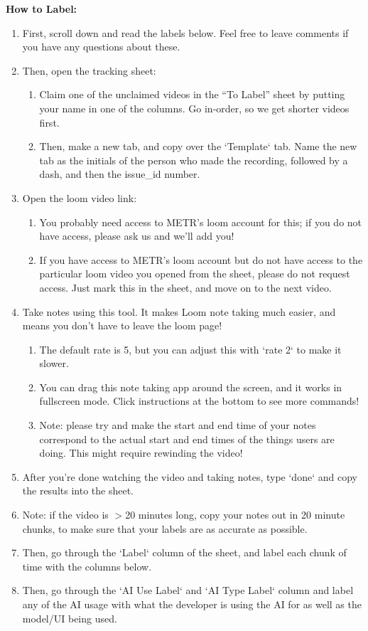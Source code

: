 \documentclass{article}
\begin{document}
\begin{instructionbox}
\textbf{How to Label:}
\begin{enumerate}
    \item First, scroll down and read the labels below. Feel free to leave comments if you have any questions about these.
    \item Then, open the tracking sheet:
    \begin{enumerate}
        \item Claim one of the unclaimed videos in the “To Label” sheet by putting your name in one of the columns. Go in-order, so we get shorter videos first.
        \item Then, make a new tab, and copy over the `Template` tab. Name the new tab as the initials of the person who made the recording, followed by a dash, and then the issue\_id number.
    \end{enumerate}
    \item Open the loom video link:
    \begin{enumerate}
        \item You probably need access to METR’s loom account for this; if you do not have access, please ask us and we’ll add you!
        \item If you have access to METR’s loom account but do not have access to the particular loom video you opened from the sheet, please do not request access. Just mark this in the sheet, and move on to the next video.
    \end{enumerate}
    \item Take notes using this tool. It makes Loom note taking much easier, and means you don’t have to leave the loom page!
    \begin{enumerate}
        \item The default rate is 5, but you can adjust this with `rate 2` to make it slower. 
        \item You can drag this note taking app around the screen, and it works in fullscreen mode. Click instructions at the bottom to see more commands!
        \item Note: please try and make the start and end time of your notes correspond to the actual start and end times of the things users are doing. This might require rewinding the video! 
    \end{enumerate}
    \item After you’re done watching the video and taking notes, type `done` and copy the results into the sheet.
    \item Note: if the video is $>$20 minutes long, copy your notes out in 20 minute chunks, to make sure that your labels are as accurate as possible.
    \item Then, go through the `Label` column of the sheet, and label each chunk of time with the columns below.
    \item Then, go through the `AI Use Label` and `AI Type Label` column and label any of the AI usage with what the developer is using the AI for as well as the model/UI being used.
\end{enumerate}



\end{instructionbox}
\end{document}
